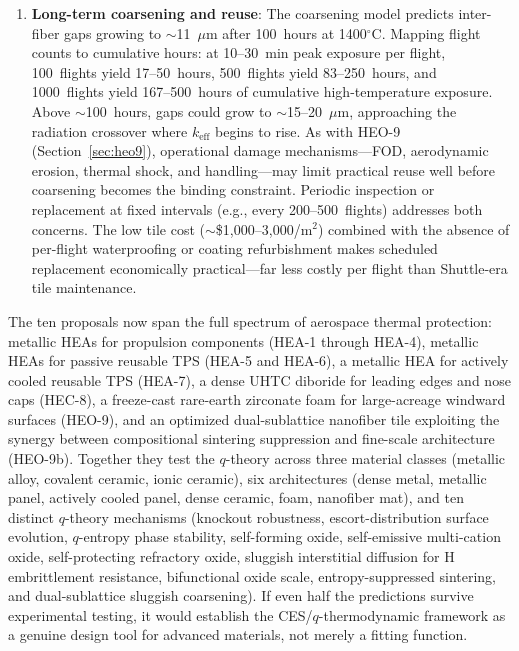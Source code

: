 \documentclass[12pt,letterpaper]{article}
\theoremstyle{definition}
\begin{document}
\begin{enumerate}
  \item \textbf{Long-term coarsening and reuse}: The coarsening model predicts inter-fiber gaps growing to $\sim$11~$\mu$m after 100~hours at 1400$^\circ$C.  Mapping flight counts to cumulative hours: at 10--30~min peak exposure per flight, 100~flights yield 17--50~hours, 500~flights yield 83--250~hours, and 1000~flights yield 167--500~hours of cumulative high-temperature exposure.  Above $\sim$100~hours, gaps could grow to $\sim$15--20~$\mu$m, approaching the radiation crossover where $k_{\mathrm{eff}}$ begins to rise.  As with HEO-9 (Section~\ref{sec:heo9}), operational damage mechanisms---FOD, aerodynamic erosion, thermal shock, and handling---may limit practical reuse well before coarsening becomes the binding constraint.  Periodic inspection or replacement at fixed intervals (e.g., every 200--500~flights) addresses both concerns.  The low tile cost ($\sim$\$1,000--3,000/m$^2$) combined with the absence of per-flight waterproofing or coating refurbishment makes scheduled replacement economically practical---far less costly per flight than Shuttle-era tile maintenance.
\end{enumerate}


The ten proposals now span the full spectrum of aerospace thermal protection: metallic HEAs for propulsion components (HEA-1 through HEA-4), metallic HEAs for passive reusable TPS (HEA-5 and HEA-6), a metallic HEA for actively cooled reusable TPS (HEA-7), a dense UHTC diboride for leading edges and nose caps (HEC-8), a freeze-cast rare-earth zirconate foam for large-acreage windward surfaces (HEO-9), and an optimized dual-sublattice nanofiber tile exploiting the synergy between compositional sintering suppression and fine-scale architecture (HEO-9b).  Together they test the $q$-theory across three material classes (metallic alloy, covalent ceramic, ionic ceramic), six architectures (dense metal, metallic panel, actively cooled panel, dense ceramic, foam, nanofiber mat), and ten distinct $q$-theory mechanisms (knockout robustness, escort-distribution surface evolution, $q$-entropy phase stability, self-forming oxide, self-emissive multi-cation oxide, self-protecting refractory oxide, sluggish interstitial diffusion for H embrittlement resistance, bifunctional oxide scale, entropy-suppressed sintering, and dual-sublattice sluggish coarsening).  If even half the predictions survive experimental testing, it would establish the CES/$q$-thermodynamic framework as a genuine design tool for advanced materials, not merely a fitting function.
\end{document}
